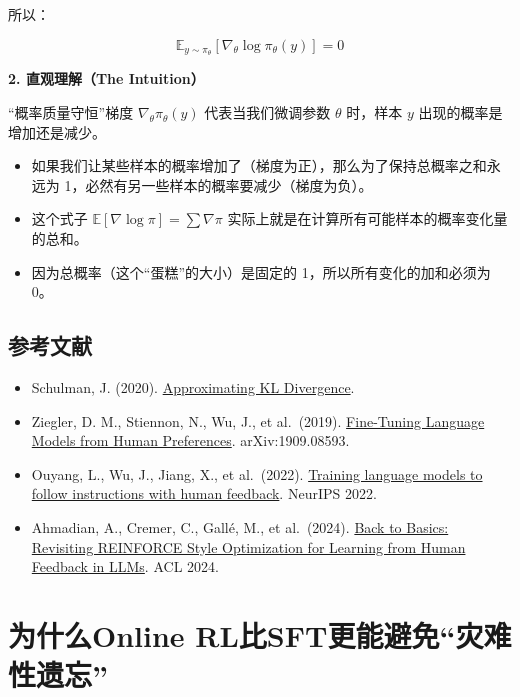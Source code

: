 所以：

\[
\mathbb{E}_{y\sim\pi_\theta}\left[\nabla_\theta\log\pi_\theta(y)\right]=0
\]

\textbf{2. 直观理解（The Intuition）}

``概率质量守恒''梯度 \(\nabla_\theta\pi_\theta(y)\) 代表当我们微调参数 \(\theta\) 时，样本 \(y\) 出现的概率是增加还是减少。

\begin{itemize}
\tightlist
\item
  如果我们让某些样本的概率增加了（梯度为正），那么为了保持总概率之和永远为 1，必然有另一些样本的概率要减少（梯度为负）。
\item
  这个式子 \(\mathbb{E}[\nabla\log\pi]=\sum\nabla\pi\) 实际上就是在计算所有可能样本的概率变化量的总和。
\item
  因为总概率（这个``蛋糕''的大小）是固定的 1，所以所有变化的加和必须为 0。
\end{itemize}

\hypertarget{ux53c2ux8003ux6587ux732e-84}{%
\subsection{参考文献}\label{ux53c2ux8003ux6587ux732e-84}}

\begin{itemize}
\tightlist
\item
  Schulman, J. (2020). \href{http://joschu.net/blog/kl-approx.html}{Approximating KL Divergence}.
\item
  Ziegler, D. M., Stiennon, N., Wu, J., et al.~(2019). \href{https://arxiv.org/abs/1909.08593}{Fine-Tuning Language Models from Human Preferences}. arXiv:1909.08593.
\item
  Ouyang, L., Wu, J., Jiang, X., et al.~(2022). \href{https://arxiv.org/abs/2203.02155}{Training language models to follow instructions with human feedback}. NeurIPS 2022.
\item
  Ahmadian, A., Cremer, C., Gallé, M., et al.~(2024). \href{https://arxiv.org/abs/2402.14740}{Back to Basics: Revisiting REINFORCE Style Optimization for Learning from Human Feedback in LLMs}. ACL 2024.
\end{itemize}

\clearpage

\hypertarget{ux4e3aux4ec0ux4e48online-rlux6bd4sftux66f4ux80fdux907fux514dux707eux96beux6027ux9057ux5fd8}{%
\section{为什么Online RL比SFT更能避免``灾难性遗忘''}\label{ux4e3aux4ec0ux4e48online-rlux6bd4sftux66f4ux80fdux907fux514dux707eux96beux6027ux9057ux5fd8}}

